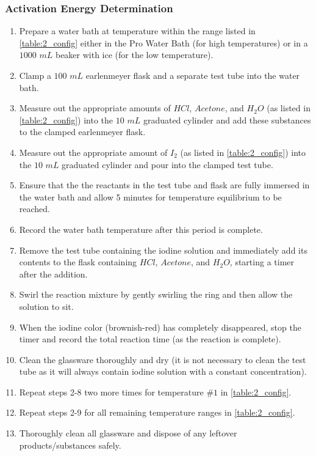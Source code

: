 \subsubsection{Activation Energy Determination}
	\begin{enumerate}[]
	  \item Prepare a water bath at temperature within the range listed in \cref{table:2_config} either in the Pro Water Bath (for high temperatures) or in a $1000$ $mL$ beaker with ice (for the low temperature).
	  \item Clamp a $100$ $mL$ earlenmeyer flask and a separate test tube into the water bath.
	  \item Measure out the appropriate amounts of $HCl$, $Acetone$, and $H_2O$ (as listed in \cref{table:2_config}) into the $10$ $mL$ graduated cylinder and add these substances to the clamped earlenmeyer flask.
	  \item Measure out the appropriate amount of $I_2$ (as listed in \cref{table:2_config}) into the $10$ $mL$ graduated cylinder and pour into the clamped test tube.
	  \item Ensure that the the reactants in the test tube and flask are fully immersed in the water bath and allow 5 minutes for temperature equilibrium to be reached.
	  \item Record the water bath temperature after this period is complete.
	  \item Remove the test tube containing the iodine solution and immediately add its contents to the flask containing $HCl$, $Acetone$, and $H_2O$, starting a timer after the addition.
	  \item Swirl the reaction mixture by gently swirling the ring and then allow the solution to sit.
	  \item When the iodine color (brownish-red) has completely disappeared, stop the timer and record the total reaction time (as the reaction is complete).
	  \item Clean the glassware thoroughly and dry (it is not necessary to clean the test tube as it will always contain iodine solution with a constant concentration).
	  \item Repeat steps 2-8 two more times for temperature $\#1$ in \cref{table:2_config}.
	  \item Repeat steps 2-9 for all remaining temperature ranges in \cref{table:2_config}.
	  \item Thoroughly clean all glassware and dispose of any leftover products/substances safely.
	\end{enumerate}

